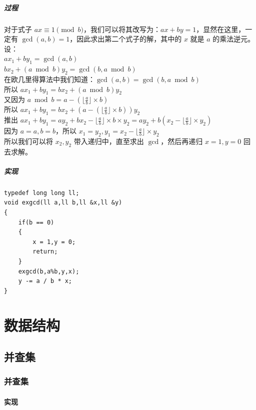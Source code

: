 \documentclass[11pt,oneside,a4paper,UTF8]{book}
\begin{document}
	\subsubsection{过程}
	\noindent
	对于式子 $ax \equiv 1 \pmod b$，我们可以将其改写为：$ax + by = 1$，显然在这里，一定有 $\gcd(a,b) = 1$，因此求出第二个式子的解，其中的 $x$ 就是 $a$ 的乘法逆元。\\
	设：\\
	$ax_1 + by_1 = \gcd(a,b)$\\
	$bx_2 + (a \bmod b)y_2 = \gcd(b,a \bmod b)$\\
	在欧几里得算法中我们知道：$\gcd(a,b) = \gcd(b,a\bmod b)$\\
	所以 $ax_1 + by_1 = bx_2 + (a \bmod b)y_2$\\
	又因为 $a \bmod b = a - (\lfloor\frac{a}{b}\rfloor\times b)$\\
	所以 $ax_1+by_1=bx_2+(a-(\lfloor\frac{a}{b}\rfloor\times b))y_2$\\
	推出 $ax_1+by_1=ay_2+bx_2-\lfloor\frac{a}{b}\rfloor\times b\times y_2=ay_2+b(x_2-\lfloor\frac{a}{b}\rfloor\times y_2)$\\
	因为 $a = a,b = b$，所以 $x_1=y_2,y_1=x_2-\lfloor\frac{a}{b}\rfloor\times y_2$\\
	所以我们可以将 $x_2,y_2$ 带入递归中，直至求出 $\gcd$，然后再递归 $x=1,y=0$ 回去求解。\\
	\subsubsection{实现}
	\begin{lstlisting}
typedef long long ll;
void exgcd(ll a,ll b,ll &x,ll &y)
{ 
	if(b == 0)
	{
		x = 1,y = 0;
		return;
	}
	exgcd(b,a%b,y,x);
	y -= a / b * x;
}
	\end{lstlisting}
	
	\part{数据结构}
	\chapter{并查集}
	\section{并查集}
	\subsection{实现}
\end{document}
